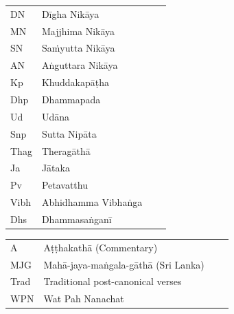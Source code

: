 \begin{tabular}{@{}llll@{}}
  DN    & Dīgha Nikāya                                        \\
  MN    & Majjhima Nikāya                                     \\
  SN    & Saṁyutta Nikāya                                     \\
  AN    & Aṅguttara Nikāya                                    \\
  Kp    & Khuddakapāṭha                                       \\
  Dhp   & Dhammapada                                          \\
  Ud    & Udāna                                               \\
  Snp   & Sutta Nipāta                                        \\
  Thag  & Theragāthā                                          \\
  Ja    & Jātaka                                              \\
  Pv    & Petavatthu                                          \\
  Vibh  & Abhidhamma Vibhaṅga                                 \\
  Dhs   & Dhammasaṅganī                                       \\
\end{tabular}

\begin{tabular}{@{}llll@{}}
  A     & Aṭṭhakathā (Commentary)                             \\
  MJG   & Mahā-jaya-maṅgala-gāthā (Sri Lanka)                 \\
  Trad  & Traditional post-canonical verses                   \\
  WPN   & Wat Pah Nanachat
\end{tabular}

\medskip

\fi

